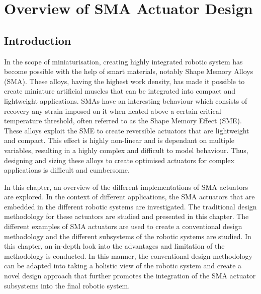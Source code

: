 
\chapter{Overview of SMA Actuator Design}\label{chap:sma-actuator-design}
\section{Introduction}
In the scope of miniaturisation, creating highly integrated robotic system has become possible with the help of smart materials, notably Shape Memory Alloys (SMA). These alloys, having the highest work density, has made it possible to create miniature artificial muscles that can be integrated into compact and lightweight applications. SMAs have an interesting behaviour which consists of recovery any strain imposed on it when heated above a certain critical temperature threshold, often referred to as the Shape Memory Effect (SME). These alloys exploit the SME to create reversible actuators that are lightweight and compact. This effect is highly non-linear and is dependant on multiple variables, resulting in a highly complex and difficult to model behaviour. Thus, designing and sizing these alloys to create optimised actuators for complex applications is difficult and cumbersome.

In this chapter, an overview of the different implementations of SMA actuators are explored. In the context of different applications, the SMA actuators that are embedded in the different robotic systems are investigated. The traditional design methodology for these actuators are studied and presented in this chapter. The different examples of SMA actuators are used to create a conventional design methodology and the different subsystems of the robotic systems are studied. In this chapter, an in-depth look into the advantages and limitation of the methodology is conducted. In this manner, the conventional design methodology can be adapted into taking a holistic view of the robotic system and create a novel design approach that further promotes the integration of the SMA actuator subsystems into the final robotic system.

